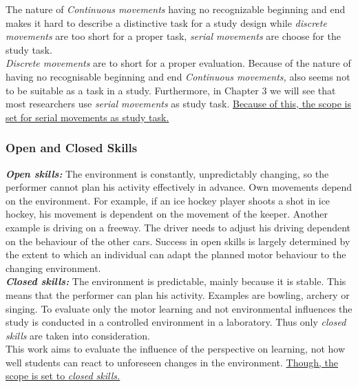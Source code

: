 The nature of \textit{Continuous movements} having no recognizable beginning and end makes it hard to describe a distinctive task for a study design while \textit{discrete movements} are too short for a proper task, \textit{serial movements} are choose for the study task.\\
\textit{Discrete movements} are to short for a proper evaluation. Because of the nature of having no recognisable beginning and end \textit{Continuous movements,} also seems not to be suitable as a task in a study. Furthermore, in Chapter 3 we will see that most researchers use \textit{serial movements} as study task. \ul{Because of this, the scope is set for serial movements as study task.}

\subsubsection{Open and Closed Skills}
\textit{\textbf{Open skills:}} The environment is constantly, unpredictably changing, so the performer cannot plan his activity effectively in advance. Own movements depend on the environment. For example, if an ice hockey player shoots a shot in ice hockey, his movement is dependent on the movement of the keeper. Another example is driving on a freeway. The driver needs to adjust his driving dependent on the behaviour of the other cars. Success in open skills is largely determined by the extent to which an individual can adapt the planned motor behaviour to the changing environment.\\
\textit{\textbf{Closed skills:}} The environment is predictable, mainly because it is stable. This means that the performer can plan his activity. Examples are bowling, archery or singing. To evaluate only the motor learning and not environmental influences the study is conducted in a controlled environment in a laboratory. Thus only \textit{closed skills} are taken into consideration.\\
This work aims to evaluate the influence of the perspective on learning, not how well students can react to unforeseen changes in the environment. \ul{Though, the scope is set to \textit{closed skills.}}


